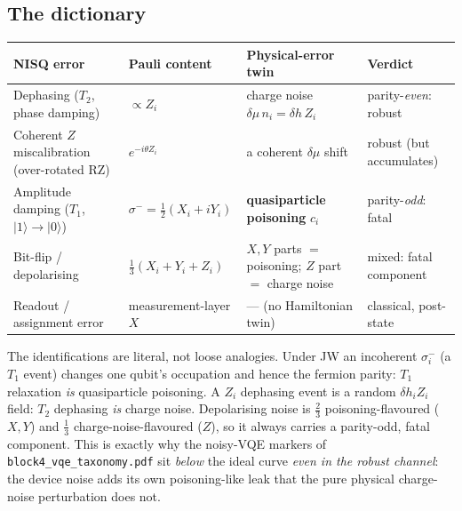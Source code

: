 \documentclass[11pt]{article}
\newcommand{\code}[1]{\texttt{#1}}
\begin{document}
\subsection{The dictionary}
\begin{center}
\renewcommand{\arraystretch}{1.35}
\begin{tabular}{@{}p{4.4cm}p{3.4cm}p{3.6cm}p{3.0cm}@{}}
\toprule
\textbf{NISQ error} & \textbf{Pauli content} & \textbf{Physical-error twin} & \textbf{Verdict} \\
\midrule
Dephasing ($T_2$, phase damping) & $\propto Z_i$ &
charge noise $\delta\mu\,n_i=\delta h\,Z_i$ &
\textcolor{topological}{parity-\emph{even}: robust} \\
Coherent $Z$ miscalibration (over-rotated RZ) & $e^{-i\theta Z_i}$ &
a coherent $\delta\mu$ shift &
\textcolor{topological}{robust} (but accumulates) \\
Amplitude damping ($T_1$, $|1\rangle\!\to\!|0\rangle$) & $\sigma^-=\tfrac12(X_i{+}iY_i)$ &
\textbf{quasiparticle poisoning} $c_i$ &
\textcolor{trivial}{parity-\emph{odd}: fatal} \\
Bit-flip / depolarising & $\tfrac13(X_i{+}Y_i{+}Z_i)$ &
$X,Y$ parts $=$ poisoning; $Z$ part $=$ charge noise &
\textcolor{trivial}{mixed: fatal component} \\
Readout / assignment error & measurement-layer $X$ & --- (no Hamiltonian twin) &
classical, post-state \\
\bottomrule
\end{tabular}
\end{center}

\noindent The identifications are literal, not loose analogies. Under JW an incoherent
$\sigma^-_i$ (a $T_1$ event) changes one qubit's occupation and hence the fermion
parity: $T_1$ relaxation \emph{is} quasiparticle poisoning. A $Z_i$ dephasing event is
a random $\delta h_i Z_i$ field: $T_2$ dephasing \emph{is} charge noise. Depolarising
noise is $\tfrac23$ poisoning-flavoured ($X,Y$) and $\tfrac13$ charge-noise-flavoured
($Z$), so it always carries a parity-odd, fatal component. This is exactly why the
noisy-VQE markers of \code{block4\_vqe\_taxonomy.pdf} sit \emph{below} the ideal curve
\emph{even in the robust channel}: the device noise adds its own poisoning-like leak
that the pure physical charge-noise perturbation does not.
\end{document}
